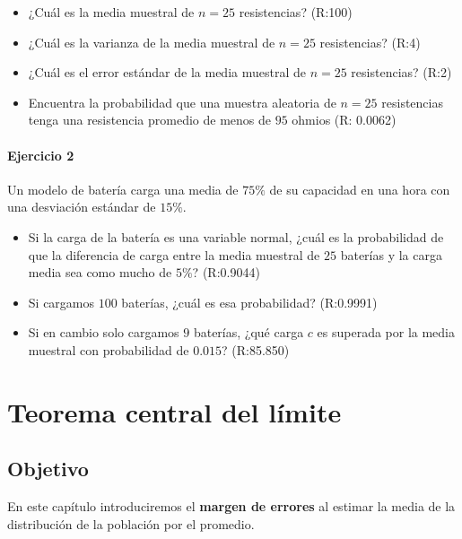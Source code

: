 \documentclass[
]{book}
\begin{document}
\begin{itemize}
\item
  ¿Cuál es la media muestral de \(n=25\) resistencias? (R:100)
\item
  ¿Cuál es la varianza de la media muestral de \(n=25\) resistencias? (R:4)
\item
  ¿Cuál es el error estándar de la media muestral de \(n=25\) resistencias? (R:2)
\item
  Encuentra la probabilidad
  que una muestra aleatoria de \(n = 25\) resistencias tenga una resistencia promedio de menos de \(95\) ohmios (R: 0.0062)
\end{itemize}

\hypertarget{ejercicio-2-7}{%
\subsubsection{Ejercicio 2}\label{ejercicio-2-7}}

Un modelo de batería carga una media de \(75\%\) de su capacidad en una hora con una desviación estándar de \(15\%\).

\begin{itemize}
\item
  Si la carga de la batería es una variable normal, ¿cuál es la probabilidad de que la diferencia de carga entre la media muestral de \(25\) baterías y la carga media sea como mucho de \(5\%\)? (R:0.9044)
\item
  Si cargamos \(100\) baterías, ¿cuál es esa probabilidad? (R:0.9991)
\item
  Si en cambio solo cargamos \(9\) baterías, ¿qué carga \(c\) es superada por la media muestral con probabilidad de \(0.015\)? (R:85.850)
\end{itemize}

\hypertarget{teorema-central-del-luxedmite}{%
\chapter{Teorema central del límite}\label{teorema-central-del-luxedmite}}

\hypertarget{objetivo-7}{%
\section{Objetivo}\label{objetivo-7}}

En este capítulo introduciremos el \textbf{margen de errores} al estimar la media de la distribución de la población por el promedio.
\end{document}
